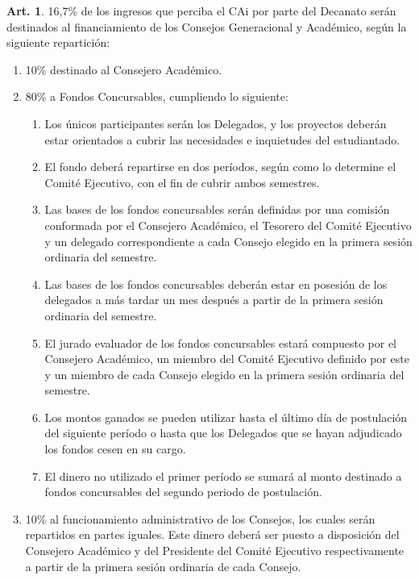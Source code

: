 \documentclass[letterpaper,11pt]{article}
\theoremstyle{definition}%
\newtheorem{art}{Art.} %
\begin{document}
\begin{art}
	16,7\% de los ingresos que perciba el CAi por parte del Decanato serán destinados al financiamiento de los Consejos Generacional y Académico, según la siguiente repartición:
	\begin{enumerate}
		\item 10\% destinado al Consejero Académico.
		\item 80\% a Fondos Concursables, cumpliendo lo siguiente:
		      \begin{enumerate}
			      \item Los únicos participantes serán los Delegados, y los proyectos deberán estar orientados a cubrir las necesidades e inquietudes del estudiantado.
			      \item El fondo deberá repartirse en dos períodos, según como lo determine el Comité Ejecutivo, con el fin de cubrir ambos semestres.
			      \item Las bases de los fondos concursables serán definidas por una comisión conformada por el Consejero Académico, el Tesorero del Comité Ejecutivo y un delegado correspondiente  a cada Consejo elegido en la primera sesión ordinaria del semestre.
			      \item Las bases de los fondos concursables deberán estar en posesión de los delegados a más tardar un mes después a partir de la primera sesión ordinaria del semestre.
			      \item El jurado evaluador de los fondos concursables estará compuesto por el Consejero Académico, un miembro del Comité Ejecutivo definido por este y un  miembro de cada Consejo elegido en la primera sesión ordinaria del semestre.
			      \item Los montos ganados se pueden utilizar hasta el último día de postulación del siguiente período o hasta que los Delegados que se hayan adjudicado los fondos cesen en su cargo.
			      \item El dinero no utilizado el primer período se sumará al monto destinado a fondos concursables del segundo periodo de postulación.
		      \end{enumerate}
		\item 10\% al funcionamiento administrativo de los Consejos, los cuales serán repartidos en partes iguales. Este dinero deberá ser puesto a disposición del Consejero Académico y del Presidente del Comité Ejecutivo respectivamente a partir de la primera sesión ordinaria de cada Consejo.
	\end{enumerate}
\end{art}
\end{document}
